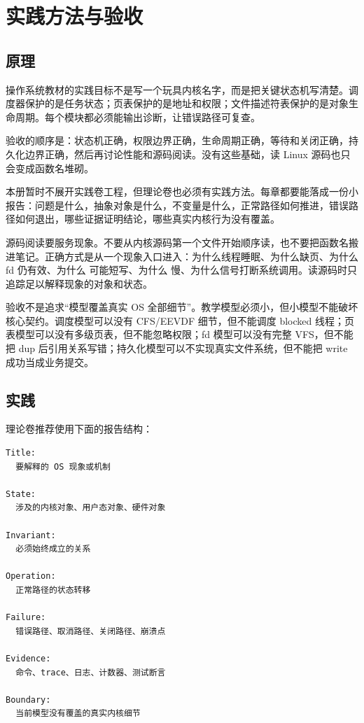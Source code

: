 \chapter{实践方法与验收}

\section{原理}

操作系统教材的实践目标不是写一个玩具内核名字，而是把关键状态机写清楚。调度器保护的是任务状态；页表保护的是地址和权限；文件描述符表保护的是对象生命周期。每个模块都必须能输出诊断，让错误路径可复查。

验收的顺序是：状态机正确，权限边界正确，生命周期正确，等待和关闭正确，持久化边界正确，然后再讨论性能和源码阅读。没有这些基础，读 Linux 源码也只会变成函数名堆砌。

本册暂时不展开实践卷工程，但理论卷也必须有实践方法。每章都要能落成一份小报告：问题是什么，抽象对象是什么，不变量是什么，正常路径如何推进，错误路径如何退出，哪些证据证明结论，哪些真实内核行为没有覆盖。

源码阅读要服务现象。不要从内核源码第一个文件开始顺序读，也不要把函数名搬进笔记。正确方式是从一个现象入口进入：为什么线程睡眠、为什么缺页、为什么 fd 仍有效、为什么  可能短写、为什么  慢、为什么信号打断系统调用。读源码时只追踪足以解释现象的对象和状态。

验收不是追求“模型覆盖真实 OS 全部细节”。教学模型必须小，但小模型不能破坏核心契约。调度模型可以没有 CFS/EEVDF 细节，但不能调度 blocked 线程；页表模型可以没有多级页表，但不能忽略权限；fd 模型可以没有完整 VFS，但不能把 dup 后引用关系写错；持久化模型可以不实现真实文件系统，但不能把 write 成功当成业务提交。

\section{实践}

理论卷推荐使用下面的报告结构：

\begin{lstlisting}
Title:
  要解释的 OS 现象或机制

State:
  涉及的内核对象、用户态对象、硬件对象

Invariant:
  必须始终成立的关系

Operation:
  正常路径的状态转移

Failure:
  错误路径、取消路径、关闭路径、崩溃点

Evidence:
  命令、trace、日志、计数器、测试断言

Boundary:
  当前模型没有覆盖的真实内核细节
\end{lstlisting}


